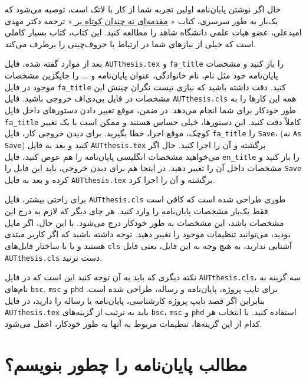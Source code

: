  حال اگر نوشتن پایان‌نامه اولین تجربه شما از کار با لاتک است، توصیه می‌شود که یک‌بار به طور سرسری، کتاب «%
\href{http://www.tug.ctan.org/tex-archive/info/lshort/persian/lshort.pdf}{مقدمه‌ای نه چندان کوتاه بر
\lr{\LaTeXe}}»
   ترجمه دکتر مهدی امیدعلی، عضو هیات علمی دانشگاه شاهد را مطالعه کنید. این کتاب، کتاب بسیار کاملی است که خیلی از نیازهای شما در ارتباط با حروف‌چینی را برطرف می‌کند.
 
 
بعد از موارد گفته شده، فایل 
\verb;AUTthesis.tex;
و
\verb;fa_title;
را باز کنید و مشخصات پایان‌نامه خود مثل نام، نام خانوادگی، عنوان پایان‌نامه و ... را جایگزین مشخصات موجود در فایل
\verb;fa_title;
 کنید. دقت داشته باشید که نیازی نیست 
نگران چینش این مشخصات در فایل پی‌دی‌اف خروجی باشید. فایل 
\verb;AUTthesis.cls;
همه این کارها را به طور خودکار برای شما انجام می‌دهد. در ضمن، موقع تغییر دادن دستورهای داخل فایل
\verb;fa_title;
 کاملاً دقت کنید. این دستورها، خیلی حساس هستند و ممکن است با یک تغییر کوچک، موقع اجرا، خطا بگیرید. برای دیدن خروجی کار، فایل 
\verb;fa_title;
 را 
\verb;Save;، 
(نه 
\verb;As Save;)
کنید و بعد به فایل 
\verb;AUTthesis.tex;
برگشته و آن را اجرا کنید. حال اگر می‌خواهید مشخصات انگلیسی پایان‌نامه را هم عوض کنید، فایل 
\verb;en_title;
را باز کنید و مشخصات داخل آن را تغییر دهید.%
 در اینجا هم برای دیدن خروجی، باید این فایل را 
\verb;Save;
کرده و بعد به فایل 
\verb;AUTthesis.tex;
برگشته و آن را اجرا کرد.

برای راحتی بیشتر، 
فایل 
\verb;AUTthesis.cls;
طوری طراحی شده است که کافی است فقط  یک‌بار مشخصات پایان‌نامه  را وارد کنید. هر جای دیگر که لازم به درج این مشخصات باشد، این مشخصات به طور خودکار درج می‌شود. با این حال، اگر مایل بودید، می‌توانید تنظیمات موجود را تغییر دهید. توجه داشته باشید که اگر کاربر مبتدی هستید و یا با ساختار فایل‌های  
\verb;cls;
 آشنایی ندارید، به هیچ وجه به این فایل، یعنی فایل 
\verb;AUTthesis.cls;
دست نزنید.

نکته دیگری که باید به آن توجه کنید این است که در فایل 
\verb;AUTthesis.cls;،
سه گزینه به نام‌های
\verb;bsc;,
\verb;msc;
و
\verb;phd;
برای تایپ پروژه، پایان‌نامه و رساله،
طراحی شده است. بنابراین اگر قصد تایپ پروژه کارشناسی، پایان‌نامه یا رساله را دارید، 
 در فایل 
\verb;AUTthesis.tex;
باید به ترتیب از گزینه‌های
\verb;bsc;،
\verb;msc;
و
\verb;phd;
استفاده کنید. با انتخاب هر کدام از این گزینه‌ها، تنظیمات مربوط به آنها به طور خودکار، اعمل می‌شود.

\section{مطالب پایان‌نامه را چطور بنویسم؟}
